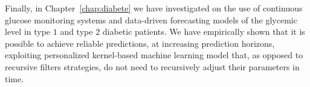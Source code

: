 Finally, in Chapter~\ref{chap:diabete} we have investigated on the use of continuous glucose monitoring systems and data-driven forecasting models of the glycemic level in type $1$ and type $2$ diabetic patients.
We have empirically shown that it is possible to achieve reliable predictions, at increasing prediction horizons, exploiting personalized kernel-based machine learning model that, as opposed to recursive filters strategies, do not need to recursively adjust their parameters in time.


